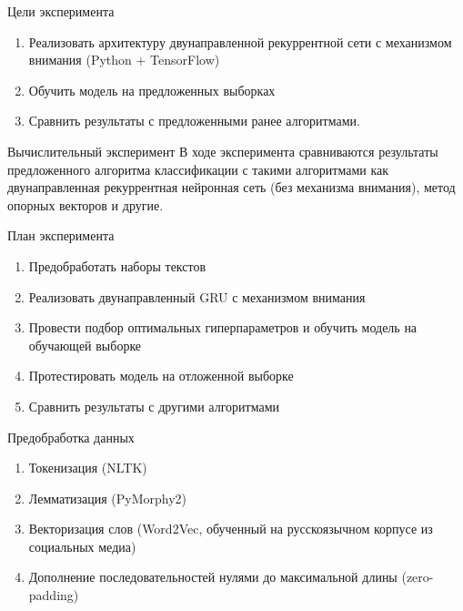 \documentclass{beamer}
\begin{document}
\begin{frame}{Цели эксперимента}
	\begin{enumerate}
		\item Реализовать архитектуру двунаправленной рекуррентной сети с механизмом внимания (Python + TensorFlow)
		\item Обучить модель на предложенных выборках
		\item Сравнить результаты с предложенными ранее алгоритмами.
	\end{enumerate}
\end{frame}
\begin{frame}{Вычислительный эксперимент}
В ходе эксперимента сравниваются результаты предложенного алгоритма классификации с такими алгоритмами как двунаправленная рекуррентная нейронная сеть (без механизма внимания), метод опорных векторов и другие. \\
\begin{block}{План эксперимента}
	\begin{enumerate}
		\item Предобработать наборы текстов
		\item Реализовать двунаправленный GRU с механизмом внимания
		\item Провести подбор оптимальных гиперпараметров и обучить модель на обучающей выборке
		\item Протестировать модель на отложенной выборке
		\item Сравнить результаты с другими алгоритмами
	\end{enumerate}
\end{block}
\end{frame}
\begin{frame}{Предобработка данных}

\begin{enumerate}
	\item Токенизация (NLTK)
	\item Лемматизация (PyMorphy2)
	\item Векторизация слов (Word2Vec, обученный на русскоязычном корпусе из социальных медиа)
	\item Дополнение последовательностей нулями до максимальной длины (zero-padding)
	
\end{enumerate}
\end{frame}
\end{document}
